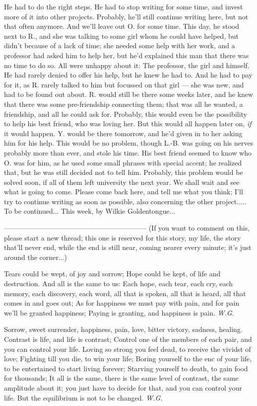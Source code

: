 He had to do the right steps. 
He had to stop writing for some time, and invest more of it into other projects. Probably, he'll still continue writing here, but not that often anymore. 
And we'll leave out O. for some time. 
This day, he stood next to R., and she was talking to some girl whom he could have helped, but didn't because of a lack of time; she needed some help with her work, and a professor had asked him to help her, but he'd explained this man that there was no time to do so. 
All were unhappy about it: The professor, the girl and himself. He had rarely denied to offer his help, but he knew he had to. 
And he had to pay for it, as R. rarely talked to him but focussed on that girl --- she was new, and had to be found out about. 
R. would still be there some weeks later, and he knew that there was some pre-friendship connecting them; that was all he wanted, a friendship, and all he could ask for. Probably, this would even be the possibility to help his best friend, who was loving her. 
But this would all happen later on, \emph{if} it would happen. 
Y. would be there tomorrow, and he'd given in to her asking him for his help. This would be no problem, though L.-B. was going on his nerves probably more than ever, and stole his time. 
His best friend seemed to know who O. was for him, as he used some small phrases with special accent; he realized that, but he was still decided not to tell him. Probably, this problem would be solved soon, if all of them left university the next year. 
We shall wait and see what is going to come. 
Please come back here, and tell me what you think; I'll try to continue writing as soon as possible, also concerning the other project.....
To be continued...
This week, by Wilkie Goldentongue...

--------------------------------------------------------------
(If you want to comment on this, please start a new thread; this one is reserved for this story, my life, the story that'll never end, while the end is still near, coming nearer every minute; it's just around the corner...)

Tears could be wept, 
of joy and sorrow; 
Hope could be kept, 
of life and destruction. 
And all is the same to us: 
Each hope, each tear, each cry, 
each memory, each discovery, each word, 
all that is spoken, all that is heard, 
all that comes in and goes out; 
As for happiness we must pay with pain, 
and for pain we'll be granted happiness; 
Paying is granting, 
and happiness is pain. 
\emph{W.G.}

Sorrow, 
sweet surrender, 
happiness, 
pain, 
love, 
bitter victory, 
sadness, 
healing. 
Contrast is life, 
and life is contrast; 
Control one of the members 
of each pair, 
and you can control your life. 
Loving so strong you feel dead, 
to receive the vividst of love; 
Fighting till you die, 
to win your life; 
Boring yourself to the enc of your life, 
to be entertained to start living forever; 
Starving yourself to death, 
to gain food for thousands; 
It all is the same, 
there is the same level of contrast, 
the same amplitude 
about it; 
you just have to decide for that, 
and you can control your life. 
But the equilibrium 
is not to be changed. 
\emph{W.G.}

